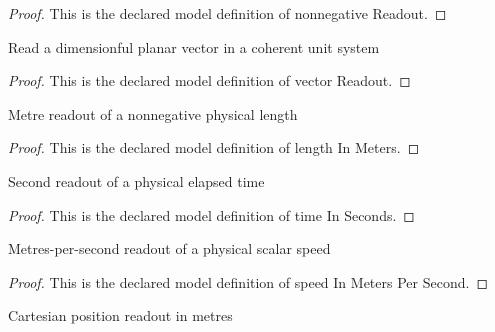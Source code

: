 \begin{proof}
  This is the declared model definition of nonnegative Readout.
\end{proof}
\begin{definition}
  \label{def:physics:phyx-mini-0745:phyxminiproblems-problemphyxmini0745-vectorreadout}
  Read a dimensionful planar vector in a coherent unit system
\end{definition}
\begin{proof}
  This is the declared model definition of vector Readout.
\end{proof}
\begin{definition}
  \label{def:physics:phyx-mini-0745:phyxminiproblems-problemphyxmini0745-lengthinmeters}
  Metre readout of a nonnegative physical length
\end{definition}
\begin{proof}
  This is the declared model definition of length In Meters.
\end{proof}
\begin{definition}
  \label{def:physics:phyx-mini-0745:phyxminiproblems-problemphyxmini0745-timeinseconds}
  Second readout of a physical elapsed time
\end{definition}
\begin{proof}
  This is the declared model definition of time In Seconds.
\end{proof}
\begin{definition}
  \label{def:physics:phyx-mini-0745:phyxminiproblems-problemphyxmini0745-speedinmeterspersecond}
  Metres-per-second readout of a physical scalar speed
\end{definition}
\begin{proof}
  This is the declared model definition of speed In Meters Per Second.
\end{proof}
\begin{definition}
  \label{def:physics:phyx-mini-0745:phyxminiproblems-problemphyxmini0745-positioninmeters}
  Cartesian position readout in metres
\end{definition}
